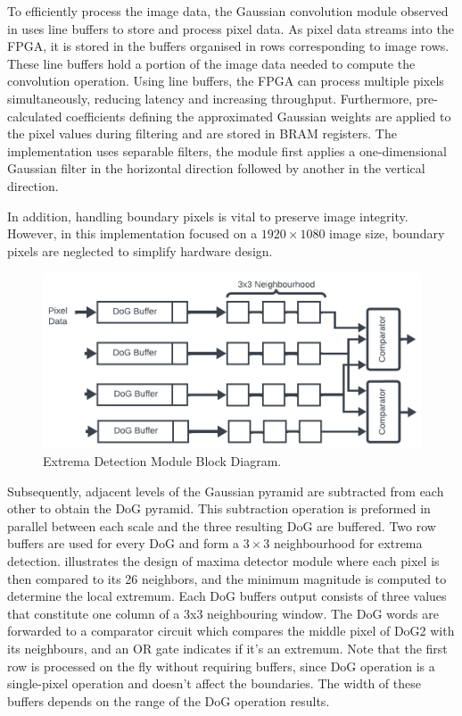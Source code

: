 To efficiently process the image data, the Gaussian convolution module observed in  uses line buffers to store and process pixel data. As pixel data streams into the FPGA, it is stored in the buffers organised in rows corresponding to image rows. These line buffers hold a portion of the image data needed to compute the convolution operation. Using line buffers, the FPGA can process multiple pixels simultaneously, reducing latency and increasing throughput. Furthermore, pre-calculated coefficients defining the approximated Gaussian weights are applied to the pixel values during filtering and are stored in BRAM registers. The implementation uses separable filters, the module first applies a one-dimensional Gaussian filter in the horizontal direction followed by another in the vertical direction. 


In addition, handling boundary pixels is vital to preserve image integrity. However, in this implementation focused on a $1920\times1080$ image size, boundary pixels are neglected to simplify hardware design. 

\begin{figure}[h]
    \centering
     \includegraphics[width=0.8\columnwidth]{Images/Extrema.png}
    \caption{Extrema Detection Module Block Diagram.}
    \label{fig:ExtremaHW}
\end{figure}


Subsequently, adjacent levels of the Gaussian pyramid are subtracted from each other to obtain the DoG pyramid. This subtraction operation is preformed in parallel between each scale and the three resulting  DoG are buffered. Two row buffers are used for every DoG and form a $3 \times 3$ neighbourhood for extrema detection.  illustrates the design of maxima detector module where each pixel is then compared to its 26 neighbors, and the minimum magnitude is computed to determine the local extremum. Each DoG buffers output consists of three values that constitute one column of a 3x3 neighbouring window. The DoG words are forwarded to a comparator circuit which compares the middle pixel of DoG2 with its neighbours, and an OR gate indicates if it's an extremum. Note that the first row is processed on the fly without requiring buffers, since DoG operation is a single-pixel operation and doesn't affect the boundaries. The width of these buffers depends on the range of the DoG operation results.




